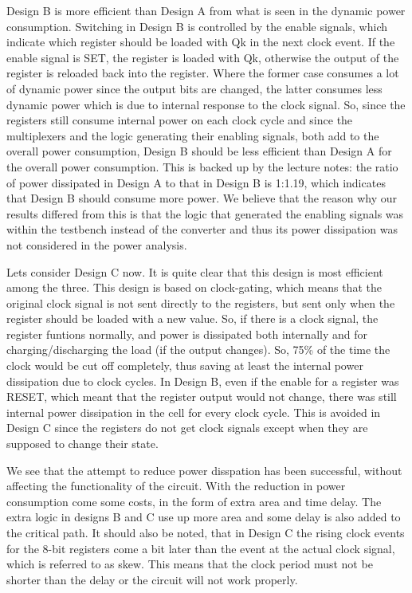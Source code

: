 \documentclass[11pt,a4paper]{article}
\begin{document}
Design B is more efficient than Design A from what is seen in the dynamic power consumption. Switching in Design B is controlled by the enable signals, which indicate which register should be loaded with Qk in the next clock event. If the enable signal is SET, the register is loaded with Qk, otherwise the output of the register is reloaded back into the register. Where the former case consumes a lot of dynamic power since the output bits are changed, the latter consumes less dynamic power which is due to internal response to the clock signal. So, since the registers still consume internal power on each clock cycle and since the multiplexers and the logic generating their enabling signals, both add to the overall power consumption, Design B should be less efficient than Design A for the overall power consumption. This is backed up by the lecture notes: the ratio of power dissipated in Design A to that in Design B is 1:1.19, which indicates that Design B should consume more power. We believe that the reason why our results differed from this is that the logic that generated the enabling signals was within the testbench instead of the converter and thus its power dissipation was not considered in the power analysis.

Lets consider Design C now. It is quite clear that this design is most efficient among the three. This design is based on clock-gating, which means that the original clock signal is not sent directly to the registers, but sent only when the register should be loaded with a new value. So, if there is a clock signal, the register funtions normally, and power is dissipated both internally and for charging/discharging the load (if the output changes). So, 75\% of the time the clock would be cut off completely, thus saving at least the internal power dissipation due to clock cycles. In Design B, even if the enable for a register was RESET, which meant that the register output would not change, there was still internal power dissipation in the cell for every clock cycle. This is avoided in Design C since the registers do not get clock signals except when they are supposed to change their state.

We see that the attempt to reduce power disspation has been successful, without affecting the functionality of the circuit. With the reduction in power consumption come some costs, in the form of extra area and time delay. The extra logic in designs B and C use up more area and some delay is also added to the critical path. It should also be noted, that in Design C the rising clock events for the 8-bit registers come a bit later than the event at the actual clock signal, which is referred to as skew. This means that the clock period must not be shorter than the delay or the circuit will not work properly.
\end{document}
